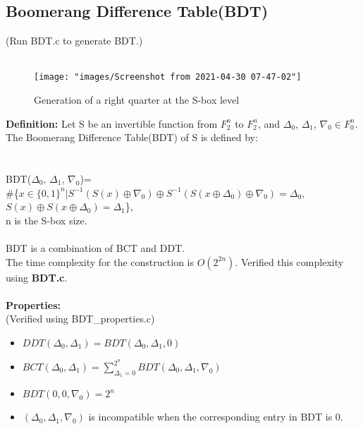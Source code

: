 \documentclass{article}
\begin{document}
\subsection{Boomerang Difference Table(BDT)}
(Run BDT.c to generate BDT.)\\\\
\begin{figure}
	\centering
	\texttt{[image: "images/Screenshot from 2021-04-30 07-47-02"]}
	\caption{Generation of a right quarter at the S-box level}
	\label{fig:screenshot-from-2021-04-30-07-47-02}
\end{figure}
\textbf{Definition:} Let S be an invertible function from $F_2^n$ to $F_2^n$, and $\Delta_0$, $\Delta_1$, $\nabla_0 \in F_0^n$. The Boomerang Difference Table(BDT) of S is defined by:\\\\\\
BDT($\Delta_0$, $\Delta_1$, $\nabla_0$)=\\ \#\{$x \in \{0,1\}^n|S^{-1}(S(x)\oplus \nabla_0)\oplus S^{-1}(S(x\oplus\Delta_0 )\oplus \nabla_0) = \Delta_0$, $S(x)\oplus S(x\oplus \Delta_0) = \Delta_1$\}, \\n is the S-box size.\\\\
BDT is a combination of BCT and DDT.\\
The time complexity for the construction is $O(2^{2n})$. Verified this complexity using \textbf{BDT.c}.\\\\
\textbf{Properties:}\\(Verified using BDT\_properties.c)\\
\begin{itemize}
	\item $DDT(\Delta_0, \Delta_1) = BDT(\Delta_0, \Delta_1,0)$
	\item $BCT(\Delta_0, \Delta_1) = \sum_{\Delta_1 = 0}^{2^n}BDT(\Delta_0, \Delta_1, \nabla_0)$
	\item $BDT(0,0,\nabla_0) = 2^n$
	\item $(\Delta_0, \Delta_1, \nabla_0)$ is incompatible when the corresponding entry in BDT is 0.
\end{itemize}
\end{document}
